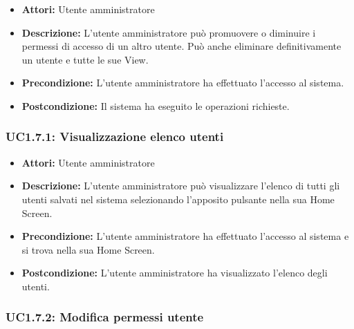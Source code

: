 \begin{itemize}
    \item \textbf{Attori:} Utente amministratore
    \item \textbf{Descrizione:} L'utente amministratore può promuovere o diminuire i permessi di accesso di un altro utente. Può anche eliminare definitivamente un utente e tutte le sue View.
    \item \textbf{Precondizione:} L'utente amministratore ha effettuato l'accesso al sistema.
    \item \textbf{Postcondizione:} Il sistema ha eseguito le operazioni richieste.
\end{itemize}

\subsubsection{UC1.7.1: Visualizzazione elenco utenti}

\begin{itemize}
    \item \textbf{Attori:} Utente amministratore
    \item \textbf{Descrizione:} L'utente amministratore può visualizzare l'elenco di tutti gli utenti salvati nel sistema selezionando l'apposito pulsante nella sua Home Screen.
    \item \textbf{Precondizione:} L'utente amministratore ha effettuato l'accesso al sistema e si trova nella sua Home Screen.
    \item \textbf{Postcondizione:} L'utente amministratore ha visualizzato l'elenco degli utenti.
\end{itemize}

\subsubsection{UC1.7.2: Modifica permessi utente}

